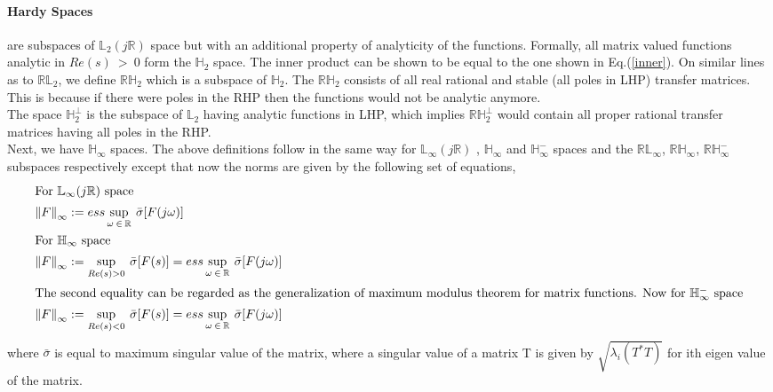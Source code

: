 \documentclass[a4paper,12pt]{article}
\newcommand\norm[1]{\left\lVert#1\right\rVert}
\begin{document}
		\paragraph{Hardy Spaces} \label{hinfnorm} are subspaces of $\mathbb{L}_{2}(j\mathbb{R})$ space but with an additional property of analyticity of the functions. Formally, all matrix valued functions analytic in $Re(s)\: > \:0$ form the $\mathbb{H}_{2}$ space. The inner product can be shown to be equal to the one shown in Eq.(\ref{inner}). On similar lines as to  $\mathbb{RL}_{2}$, we define  $\mathbb{RH}_{2}$ which is a subspace of $\mathbb{H}_{2}$. The $\mathbb{RH}_{2}$ consists of all real rational and stable (all poles in LHP) transfer matrices. This is because if there were poles in the RHP then the functions would not be analytic anymore.\\
		 The space $\mathbb{H}_{2}^{\perp}$ is the subspace of $\mathbb{L}_{2}$ having analytic functions in LHP, which implies  $\mathbb{RH}_{2}^{\perp}$ would contain all proper rational transfer matrices having all poles in the RHP.
		\\Next, we have  $\mathbb{H}_{\infty}$ spaces. The above definitions follow in the same way for $\mathbb{L}_{\infty}(j\mathbb{R})$ , $\mathbb{H}_{\infty}$ and $\mathbb{H}_{\infty}^{-}$ spaces and the $\mathbb{RL}_{\infty}$, $\mathbb{RH}_{\infty}$, $\mathbb{RH}_{\infty}^{-}$ subspaces respectively except that now the norms are given by the following set of equations,
		\begin{align*}
		\intertext{For $\mathbb{L}_{\infty}(j\mathbb{R})$ space}
		\norm{F}_{\infty} &:= ess \sup_{\omega\:\in\:\mathbb{R}} \: \bar{\sigma} [F(j\omega)] \\
		\intertext{For $\mathbb{H}_{\infty}$ space}
		\norm{F}_{\infty} &:= \sup_{Re(s) > 0} \: \bar{\sigma} [F(s)] = ess \sup_{\omega\:\in\:\mathbb{R}} \: \bar{\sigma} [F(j\omega)] \\
		\intertext{The second equality can be regarded as the generalization of maximum modulus theorem for matrix functions. Now for $\mathbb{H}_{\infty}^{-}$ space}
		\norm{F}_{\infty} &:= \sup_{Re(s) < 0} \: \bar{\sigma} [F(s)] = ess \sup_{\omega\:\in\:\mathbb{R}} \: \bar{\sigma} [F(j\omega)]
		\end{align*}
		where $\bar{\sigma}$ is equal to maximum singular value of the matrix, where a singular value of a matrix T is given by $\sqrt{\lambda_{i}(T^{*}T)}$ for ith eigen value of the matrix.
\end{document}
